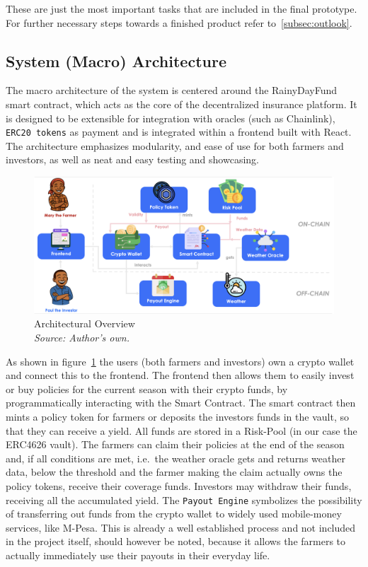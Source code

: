 \documentclass[11pt,a4paper]{article}
\begin{document}
	These are just the most important tasks that are included in the final prototype.
	For further necessary steps towards a finished product refer to~\ref{subsec:outlook}.


	\subsection{System (Macro) Architecture}\label{subsec:system-architecture}
	The macro architecture of the system is centered around the RainyDayFund smart contract, which acts as the core of the decentralized insurance platform.
	It is designed to be extensible for integration with oracles (such as Chainlink), \texttt{ERC20 tokens} as payment and is integrated within a frontend built with React.
	The architecture emphasizes modularity, and ease of use for both farmers and investors, as well as neat and easy testing and showcasing.

	\begin{figure}[H]
		\centering
		\includegraphics[scale=0.3]{graphics/Architectural_Overview}
		\caption{Architectural Overview \\ \textit{Source: Author's own.}}
		\label{fig:architecture}
	\end{figure}

	As shown in figure~\ref{fig:architecture} the users (both farmers and investors) own a crypto wallet and connect this to the frontend.
	The frontend then allows them to easily invest or buy policies for the current season with their crypto funds, by programmatically interacting with the Smart Contract.
	The smart contract then mints a policy token for farmers or deposits the investors funds in the vault, so that they can receive a yield.
	All funds are stored in a Risk-Pool (in our case the ERC4626 vault).
	The farmers can claim their policies at the end of the season and, if all conditions are met, i.e.\ the weather oracle gets and returns weather data, below the threshold and the farmer making the claim actually owns the policy tokens, receive their coverage funds.
	Investors may withdraw their funds, receiving all the accumulated yield.
	The \texttt{Payout Engine} symbolizes the possibility of transferring out funds from the crypto wallet to widely used mobile-money services, like M-Pesa.
	This is already a well established process and not included in the project itself, should however be noted, because it allows the farmers to actually immediately use their payouts in their everyday life.
\end{document}
